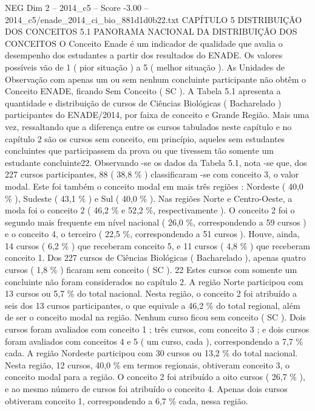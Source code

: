 \begin{textsample}{NEG Dim 2 – 2014\_c5 – Score -3.00 – 2014\_c5/enade\_2014\_ci\_bio\_881d1d0b22.txt}  \label{ex:f2_neg_121}
CAPÍTULO 5 DISTRIBUIÇÃO DOS CONCEITOS 5.1 PANORAMA NACIONAL DA DISTRIBUIÇÃO DOS CONCEITOS O Conceito Enade é um indicador de qualidade que avalia o desempenho dos estudantes a partir dos resultados do ENADE.
Os valores possíveis vão de 1 ( pior situação ) a 5 ( melhor situação ).
As Unidades de Observação com apenas um ou sem nenhum concluinte participante não obtêm o Conceito ENADE, ficando Sem Conceito ( SC ).
A Tabela 5.1 apresenta a quantidade e distribuição de cursos de Ciências Biológicas ( Bacharelado ) participantes do ENADE/2014, por faixa de conceito e Grande Região.
Mais uma vez, ressaltando que a diferença entre os cursos tabulados neste capítulo e no capítulo 2 são os cursos sem conceito, em princípio, aqueles sem estudantes concluintes que participassem da prova ou que tivessem tão somente um estudante concluinte22.
Observando -se os dados da Tabela 5.1, nota -se que, dos 227 cursos participantes, 88 ( 38,8 \% ) classificaram -se com conceito 3, o valor modal.
Este foi também o conceito modal em mais três regiões : Nordeste ( 40,0 \% ), Sudeste ( 43,1 \% ) e Sul ( 40,0 \% ).
Nas regiões Norte e Centro-Oeste, a moda foi o conceito 2 ( 46,2 \% e 52,2 \%, respectivamente ).
O conceito 2 foi o segundo mais frequente em nível nacional ( 26,0 \%, correspondendo a 59 cursos ) e o conceito 4, o terceiro ( 22,5 \%, correspondendo a 51 cursos ).
Houve, ainda, 14 cursos ( 6,2 \% ) que receberam conceito 5, e 11 cursos ( 4,8 \% ) que receberam conceito 1.
Dos 227 cursos de Ciências Biológicas ( Bacharelado ), apenas quatro cursos ( 1,8 \% ) ficaram sem conceito ( SC ). 22 Estes cursos com somente um concluinte não foram considerados no capítulo 2.
A região Norte participou com 13 cursos ou 5,7 \% do total nacional.
Nesta região, o conceito 2 foi atribuído a seis dos 13 cursos participantes, o que equivale a 46,2 \% do total regional, além de ser o conceito modal na região.
Nenhum curso ficou sem conceito ( SC ).
Dois cursos foram avaliados com conceito 1 ; três cursos, com conceito 3 ; e dois cursos foram avaliados com conceitos 4 e 5 ( um curso, cada ), correspondendo a 7,7 \% cada.
A região Nordeste participou com 30 cursos ou 13,2 \% do total nacional.
Nesta região, 12 cursos, 40,0 \% em termos regionais, obtiveram conceito 3, o conceito modal para a região.
O conceito 2 foi atribuído a oito cursos ( 26,7 \% ), e ao mesmo número de cursos foi atribuído o conceito 4.
Apenas dois cursos obtiveram conceito 1, correspondendo a 6,7 \% cada, nessa região.

\end{textsample}
